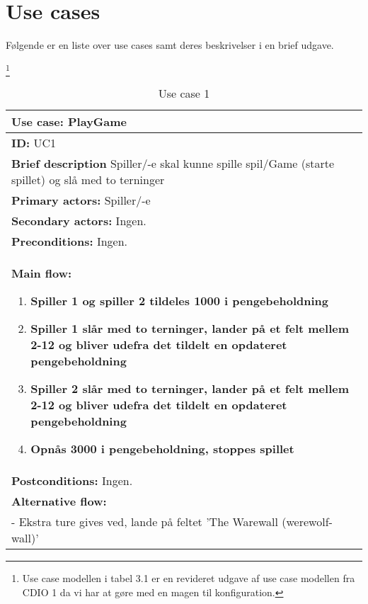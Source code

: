 \section{Use cases}

Følgende er en liste over use cases samt deres beskrivelser i en brief udgave.

\footnote{Use case modellen i tabel 3.1 er en revideret udgave af use case modellen fra CDIO 1 da vi har at gøre med en magen til konfiguration.}

\begin{table}[H]
    \begin{center}
        \begin{tabular}{ | p{15cm} |}
            \hline
            \textbf{Use case:} PlayGame \\ \hline
            \textbf{ID:} UC1 \\ \hline
            \textbf{Brief description} Spiller/-e skal kunne spille spil/Game (starte spillet) og slå med to terninger     \\ \hline
            \textbf{Primary actors:} Spiller/-e \\ \hline
            \textbf{Secondary actors:} Ingen. \\ \hline
            \textbf{Preconditions:} Ingen.     \\ \hline
            \textbf{Main flow:}
            \begin{enumerate}
                \item \textbf{Spiller 1 og spiller 2 tildeles 1000 i pengebeholdning}
                \item \textbf{Spiller 1 slår med to terninger, lander på et felt mellem 2-12 og bliver udefra det tildelt en opdateret pengebeholdning}
                \item \textbf{Spiller 2 slår med to terninger, lander på et felt mellem 2-12 og bliver udefra det tildelt en opdateret pengebeholdning}
                \item \textbf{Opnås 3000 i pengebeholdning, stoppes spillet} 
            \end{enumerate} \\ \hline
            \textbf{Postconditions:} Ingen.\\ \hline
            \textbf{Alternative flow:}
            \\- Ekstra ture gives ved, lande på feltet 'The Warewall (werewolf-wall)' \\ \hline
            \hline
        \end{tabular}
        \caption{Use case 1}
        \label{usecase:1}
    \end{center}
\end{table}

